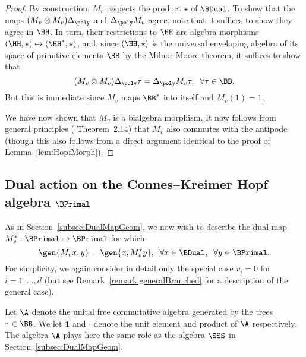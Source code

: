 \documentclass{article}
\begin{document}
\begin{proof}
By construction, $M_v$ respects the product $\star$ of $\BDual$.
To show that the maps $(M_v\otimes M_v) \Delta_\poly$ and $\Delta_\poly M_v$ agree, note that it suffices to show they agree in $\HH$. In turn, their restrictions to $\HH$ are algebra morphisms $(\HH,\star) \mapsto (\HH^*,\star)$, and, since $(\HH,\star)$ is the universal enveloping algebra of its space of primitive elements $\BB$ by the Milnor-Moore theorem, it suffices to show that
\[
(M_v\otimes M_v)\Delta_\poly \tau = \Delta_\poly M_v \tau, \; \; \forall \tau \in \BB.
\]
But this is immediate since $M_v$ maps $\BB^*$ into itself and $M_v(1) = 1$.

We have now shown that $M_v$ is a bialgebra morphism. It now follows from general principles (\cite{Preiss16} Theorem~2.14) that $M_v$ also commutes with the antipode (though this also follows from a direct argument identical to the proof of Lemma~\ref{lem:HopfMorph}).
\end{proof}


\subsection{Dual action on the Connes--Kreimer Hopf algebra $\BPrimal$}  \label{subsec:DualMapBranched}


As in Section~\ref{subsec:DualMapGeom}, we now wish to describe the dual map $M_v^* : \BPrimal \mapsto \BPrimal$ for which
\[
\gen{M_v x, y} = \gen{x, M_v^* y}, \; \; \forall x \in \BDual, \; \; \forall y \in \BPrimal.
\]
For simplicity, we again consider in detail only the special case $v_i = 0$ for $i=1,\ldots, d$ (but see Remark~\ref{remark:generalBranched} for a description of the general case).


Let $\A$ denote the unital free commutative algebra generated by the trees $\tau \in \BB$. We let $\mathbf{1}$ and $\cdot$ denote the unit element and product of $\A$ respectively. The algebra $\A$ plays here the same role as the algebra $\SSS$ in Section~\ref{subsec:DualMapGeom}.
\end{document}
